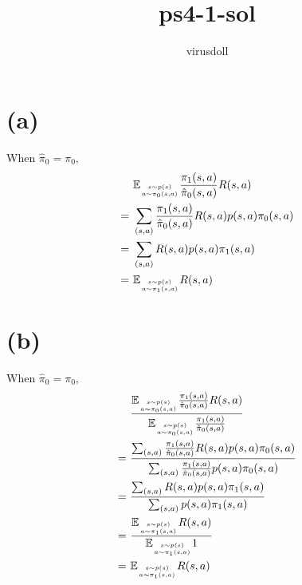 \documentclass[11pt, a4paper]{article}
\title{ps4-1-sol}
\author{virusdoll}
\begin{document}
    \maketitle
    
    \section*{(a)}
    When $\hat{\pi}_0 = \pi_0$,
    \begin{align*}
        & \ \mathbb{E}_{\genfrac{}{}{0pt}{2}{s \sim p(s)}{a \sim \pi_0(s,a)}}
        \frac{\pi_1 (s, a)}{\hat{\pi}_0 (s,a)} R(s,a) \\
        = & \ \sum_{(s,a)} \frac{\pi_1 (s, a)}{\hat{\pi}_0 (s,a)} R(s,a) p(s,a) \pi_0(s,a) \\
        = & \ \sum_{(s,a)} R(s,a) p(s,a) \pi_1(s,a) \\
        = & \ \mathbb{E}_{\genfrac{}{}{0pt}{2}{s \sim p(s)}{a \sim \pi_1(s,a)}} R(s,a)
    \end{align*}

    \section*{(b)}
    When $\hat{\pi}_0 = \pi_0$,
    \begin{align*}
        & \ \frac{
            \mathbb{E}_{\genfrac{}{}{0pt}{2}{s \sim p(s)}{a \sim \pi_0(s,a)}}
            \frac{\pi_1 (s, a)}{\hat{\pi}_0 (s,a)} R(s,a)
        }{
            \mathbb{E}_{\genfrac{}{}{0pt}{2}{s \sim p(s)}{a \sim \pi_0(s,a)}}
            \frac{\pi_1 (s, a)}{\hat{\pi}_0 (s,a)}
        } \\
        = & \ \frac{
            \sum_{(s,a)} \frac{\pi_1 (s, a)}{\hat{\pi}_0 (s,a)} R(s,a) p(s,a) \pi_0(s,a)
        }{
            \sum_{(s,a)} \frac{\pi_1 (s, a)}{\hat{\pi}_0 (s,a)} p(s,a) \pi_0(s,a)
        } \\
        = & \ \frac{
            \sum_{(s,a)} R(s,a) p(s,a) \pi_1(s,a)
        }{
            \sum_{(s,a)} p(s,a) \pi_1(s,a)
        } \\
        = & \ \frac{
            \mathbb{E}_{\genfrac{}{}{0pt}{2}{s \sim p(s)}{a \sim \pi_1(s,a)}} R(s,a)
        }{
            \mathbb{E}_{\genfrac{}{}{0pt}{2}{s \sim p(s)}{a \sim \pi_1(s,a)}} 1
        } \\
        = & \ \mathbb{E}_{\genfrac{}{}{0pt}{2}{s \sim p(s)}{a \sim \pi_1(s,a)}} R(s,a)
    \end{align*}
\end{document}
